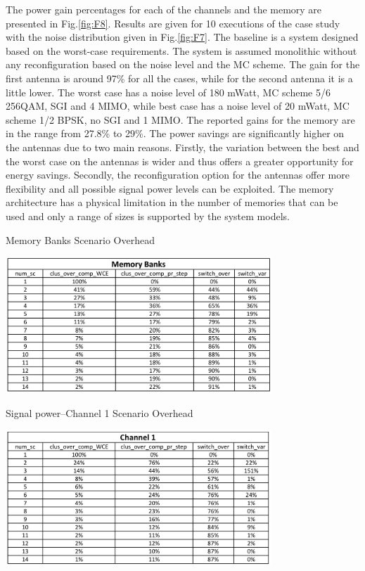 	The power gain percentages for each of the channels and the memory are presented in Fig.\ref{fig:F8}. Results are given for 10 executions of the case study with the noise distribution given in Fig.\ref{fig:F7}. The baseline is a system designed based on the worst-case requirements. The system is assumed monolithic without any reconfiguration based on the noise level and the MC scheme. The gain for the first antenna is around 97\% for all the cases, while for the second antenna it is a little lower. The worst case has a noise level of 180 mWatt, MC scheme 5/6 256QAM, SGI and 4 MIMO, while best case has a noise level of 20 mWatt, MC scheme 1/2 BPSK, no SGI and 1 MIMO. The reported gains for the memory are in the range from 27.8\% to 29\%. The power savings are significantly higher on the antennas due to two main reasons. Firstly, the variation between the best and the worst case on the antennas is wider and thus offers a greater opportunity for energy savings. Secondly, the reconfiguration option for the antennas offer more flexibility and all possible signal power levels can be exploited. The memory architecture has a physical limitation in the number of memories that can be used and only a range of sizes is supported by the system models.

\begin{table}
\centering
	\caption{Memory Banks Scenario Overhead}
	\label{tab:F1}
	\includegraphics[width=0.75\textwidth]{F/tab1.png}
\end{table} 

\begin{table}
\centering
	\caption{Signal power–Channel 1 Scenario Overhead}
	\label{tab:F2}
	\includegraphics[width=0.75\textwidth]{F/tab2.png}
\end{table} 

